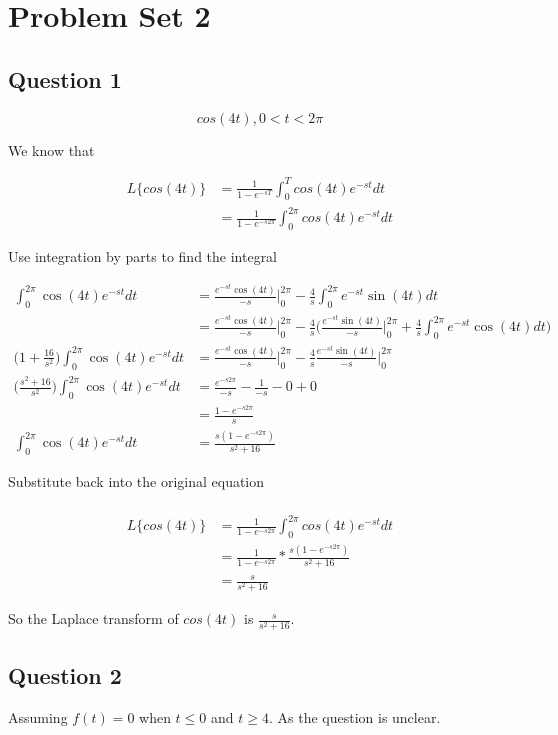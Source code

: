 \documentclass[titlepage]{article}
\begin{document}
\section{Problem Set 2}
\subsection{Question 1}
$$cos(4t), 0 < t < 2\pi$$

\noindent We know that

\begin{align*}
  L\{cos(4t)\} &= \frac{1}{1 - e^{-sT}} \int_0^T cos(4t)e^{-st} dt
  \\&= \frac{1}{1 - e^{-s2\pi}} \int_0^{2\pi} cos(4t)e^{-st} dt
\end{align*}

\noindent Use integration by parts to find the integral

\begin{align*}
  \int_0^{2\pi} \cos(4t)e^{-st} dt &= \frac{e^{-st}\cos(4t)}{-s}\Big|_0^{2\pi} - \frac{4}{s} \int_0^{2\pi} e^{-st}\sin(4t) dt
  \\&= \frac{e^{-st}\cos(4t)}{-s}\Big|_0^{2\pi} - \frac{4}{s} \bigg(\frac{e^{-st}\sin(4t)}{-s}\Big|_0^{2\pi} + \frac{4}{s}\int_0^{2\pi}e^{-st}\cos(4t) dt\bigg)
  \\\bigg(1 + \frac{16}{s^2}\bigg)\int_0^{2\pi} \cos(4t)e^{-st} dt &= \frac{e^{-st}\cos(4t)}{-s}\Big|_0^{2\pi} - \frac{4}{s}\frac{e^{-st}\sin(4t)}{-s}\Big|_0^{2\pi}
  \\\bigg(\frac{s^2 + 16}{s^2}\bigg)\int_0^{2\pi} \cos(4t)e^{-st} dt &= \frac{e^{-s2\pi}}{-s} - \frac{1}{-s} - 0 + 0
  \\&= \frac{1 - e^{-s2\pi}}{s}
  \\\int_0^{2\pi} \cos(4t)e^{-st} dt &= \frac{s(1 - e^{-s2\pi})}{s^2 + 16}
\end{align*}

\noindent Substitute back into the original equation

\begin{align*}
  \\L\{cos(4t)\} &= \frac{1}{1 - e^{-s2\pi}} \int_0^{2\pi} cos(4t)e^{-st} dt
  \\&= \frac{1}{1 - e^{-s2\pi}} * \frac{s(1 - e^{-s2\pi})}{s^2 + 16}
  \\&= \frac{s}{s^2 + 16}
\end{align*}

\noindent So the Laplace transform of $cos(4t)$ is $\frac{s}{s^2 + 16}$.

\subsection{Question 2}
Assuming $f(t) = 0$ when $t \le 0$ and $t \ge 4$. As the question is unclear.
\end{document}
